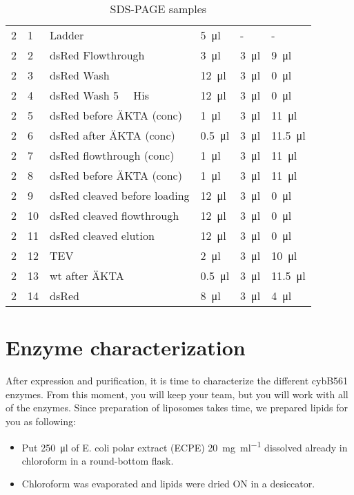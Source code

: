 \begin{table}
\begin{tabu}{llllll}
		2 & 1 & Ladder & \SI{5}{\ul} & - & - \\
		2 & 2 & dsRed Flowthrough & \SI{3}{\ul} & \SI{3}{\ul} & \SI{9}{\ul} \\
		2 & 3 & dsRed Wash & \SI{12}{\ul} & \SI{3}{\ul} & \SI{0}{\ul} \\
		2 & 4 & dsRed Wash \SI{5}{\milli\Molar} His & \SI{12}{\ul} & \SI{3}{\ul} & \SI{0}{\ul} \\
		2 & 5 & dsRed before ÄKTA (conc) & \SI{1}{\ul} & \SI{3}{\ul} & \SI{11}{\ul} \\
		2 & 6 & dsRed after ÄKTA (conc) & \SI{0.5}{\ul} & \SI{3}{\ul} & \SI{11.5}{\ul} \\
		2 & 7 & dsRed flowthrough (conc) & \SI{1}{\ul} & \SI{3}{\ul} & \SI{11}{\ul} \\
		2 & 8 & dsRed before ÄKTA (conc) & \SI{1}{\ul} & \SI{3}{\ul} & \SI{11}{\ul} \\
		2 & 9 & dsRed cleaved before loading & \SI{12}{\ul} & \SI{3}{\ul} & \SI{0}{\ul} \\
		2 & 10 & dsRed cleaved flowthrough & \SI{12}{\ul} & \SI{3}{\ul} & \SI{0}{\ul} \\
		2 & 11 & dsRed cleaved elution & \SI{12}{\ul} & \SI{3}{\ul} & \SI{0}{\ul} \\
		2 & 12 & TEV & \SI{2}{\ul} & \SI{3}{\ul} & \SI{10}{\ul} \\
		2 & 13 & wt after ÄKTA & \SI{0.5}{\ul} & \SI{3}{\ul} & \SI{11.5}{\ul} \\
		2 & 14 & dsRed & \SI{8}{\ul} & \SI{3}{\ul} & \SI{4}{\ul} \\
		\bottomrule
	\end{tabu}
	\caption{SDS-PAGE samples}
	\label{tbl:sds_samples}
\end{table}

\section{Enzyme characterization}

After expression and purification, it is time to characterize the different
cybB561 enzymes. From this moment, you will keep your team, but you will work
with all of the enzymes.  Since preparation of liposomes takes time, we
prepared lipids for you as following:  
\begin{itemize}
	\item Put \SI{250}{\ul} of E. coli polar extract (ECPE)
		\SI{20}{\mg\per\ml} dissolved already in chloroform in a
		round-bottom flask. 
	\item Chloroform was evaporated and lipids were dried ON in a
		desiccator.
\end{itemize}

